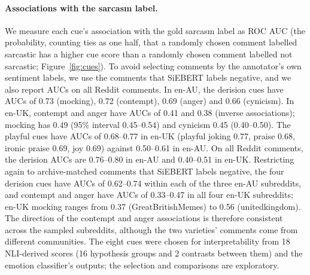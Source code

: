 \documentclass[11pt]{article}
\begin{document}
\paragraph{Associations with the sarcasm label.} We measure each cue's association with the gold sarcasm label as ROC
AUC (the probability, counting ties as one half, that a randomly chosen comment labelled sarcastic has a higher cue score than a randomly chosen
comment labelled not sarcastic; Figure~\ref{fig:cues}). To avoid selecting comments by the annotator's own sentiment
labels, we use the comments that SiEBERT labels negative, and we also report AUCs on all Reddit comments. In en-AU, the
derision cues have AUCs of 0.73 (mocking), 0.72 (contempt), 0.69 (anger) and 0.66 (cynicism). In en-UK, contempt and
anger have AUCs of 0.41 and 0.38 (inverse associations); mocking has 0.49 (95\% interval 0.45--0.54) and cynicism 0.45
(0.40--0.50). The playful cues have AUCs of 0.68--0.77 in en-UK (playful joking 0.77, praise 0.68, ironic praise 0.69, joy 0.69)
against 0.50--0.61 in en-AU. On all Reddit comments, the derision AUCs are 0.76--0.80 in en-AU and 0.40--0.51 in en-UK.
Restricting again to archive-matched comments that SiEBERT labels negative, the four derision cues have AUCs of
0.62--0.74 within each of the three en-AU subreddits, and contempt and
anger have AUCs of 0.33--0.47 in all four en-UK subreddits; en-UK mocking ranges from 0.37 (GreatBritishMemes) to 0.56
(unitedkingdom). The direction of the contempt and anger associations is therefore consistent across the sampled
subreddits, although the two varieties' comments come from different communities. The eight cues were chosen for
interpretability from 18 NLI-derived scores (16 hypothesis groups and 2 contrasts between them) and the emotion
classifier's outputs; the selection and comparisons are exploratory.
\end{document}
